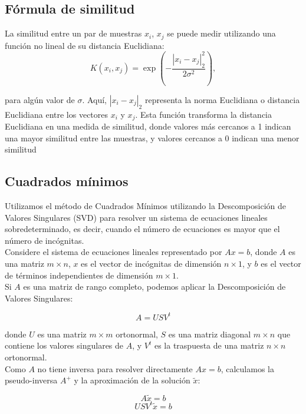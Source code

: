 \documentclass[12pt,a4]{article} %
\begin{document}
\subsection{Fórmula de similitud}
\label{similitud}
La similitud entre un par de muestras $x_i$, $x_j$ se puede medir utilizando una función no lineal de su distancia Euclidiana:
\begin{equation}
    K (x_i, x_j) = \exp \left( -\frac{|x_i - x_j|_2^2}{2\sigma^2} \right),
    \label{eq: Similitud}
\end{equation}


para algún valor de $\sigma$. Aquí, $|x_i - x_j|_2$ representa la norma Euclidiana o distancia Euclidiana entre los vectores $x_i$ y $x_j$. Esta función transforma la distancia Euclidiana en una medida de similitud, donde valores más cercanos a 1 indican una mayor similitud entre las muestras, y valores cercanos a 0 indican una menor similitud

\subsection{Cuadrados mínimos}
\label{cuads_mins}

Utilizamos el método de Cuadrados Mínimos utilizando la Descomposición de Valores Singulares (SVD) para resolver un sistema de ecuaciones lineales sobredeterminado, es decir, cuando el número de ecuaciones es mayor que el número de incógnitas.
\\

Considere el sistema de ecuaciones lineales representado por $Ax = b$, donde $A$ es una matriz $m \times n$, $x$ es el vector de incógnitas de dimensión $n \times 1$, y $b$ es el vector de términos independientes de dimensión $m \times 1$.
\\

Si $A$ es una matriz de rango completo, podemos aplicar la Descomposición de Valores Singulares:

\[
A = USV^t
\]

donde $U$ es una matriz $m \times m$ ortonormal, $S$ es una matriz diagonal $m \times n$ que contiene los valores singulares de $A$, y $V^t$ es la traspuesta de una matriz $n \times n$ ortonormal.
\\

Como $A$ no tiene inversa para resolver directamente $Ax = b$, calculamos la pseudo-inversa $A^+$ y la aproximación de la solución $\tilde{x}$:

\[
A\tilde{x} = b
\]
\[
US V^t \tilde{x} = b
\]
\end{document}
